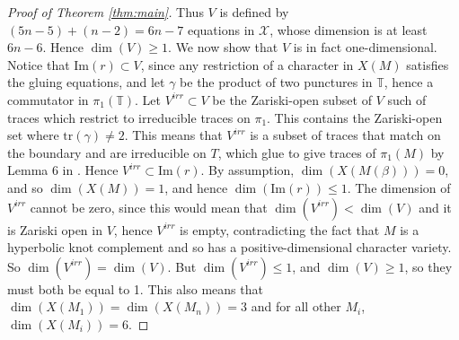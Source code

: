 \documentclass{article}
\theoremstyle{plain}
\theoremstyle{definition}
\theoremstyle{plain}
\theoremstyle{plain}
\theoremstyle{plain}
\theoremstyle{remark}
\theoremstyle{remark}
\theoremstyle{plain}
\theoremstyle{plain}
\begin{document}
\begin{proof}[Proof of Theorem \ref{thm:main}]
	Thus $V$ is defined by $(5n - 5) + (n - 2) = 6n - 7$ equations in $\mathcal{X}$, whose dimension is at least $6n - 6$. Hence $\dim(V) \geq 1$. We now show that $V$ is in fact one-dimensional. Notice that $\text{Im}(r) \subset V$, since any restriction of a character in $X(M)$ satisfies the gluing equations, and let $\gamma$ be the product of two punctures in $\mathbb{T}$, hence a commutator in $\pi_1(\mathbb{T})$. Let $V^{irr} \subset V$ be the Zariski-open subset of $V$ such of traces which restrict to irreducible traces on $\pi_1$. This contains the Zariski-open set where $\text{tr}(\gamma) \neq 2$. This means that $V^{irr}$ is a subset of traces that match on the boundary and are irreducible on $T$, which glue to give traces of $\pi_1(M)$ by Lemma 6 in \cite{Paoluzzi2010ConwaySA}. Hence $V^{irr} \subset \text{Im}(r)$. By assumption, $\dim(X(M(\beta))) = 0$, and so $\dim(X(M)) = 1$, and hence $\dim(\text{Im}(r)) \leq 1$. The dimension of $V^{irr}$ cannot be zero, since this would mean that $\dim(V^{irr}) < \dim(V)$ and it is Zariski open in $V$, hence $V^{irr}$ is empty, contradicting the fact that $M$ is a hyperbolic knot complement and so has a positive-dimensional character variety. So $\dim(V^{irr}) = \dim(V)$. But $\dim(V^{irr}) \leq 1$, and $\dim(V) \geq 1$, so they must both be equal to 1. This also means that $\dim(X(M_1)) = \dim(X(M_n)) = 3$ and for all other $M_i$, $\dim(X(M_i)) = 6$.
	
	\medskip
	

\end{proof}
\end{document}
